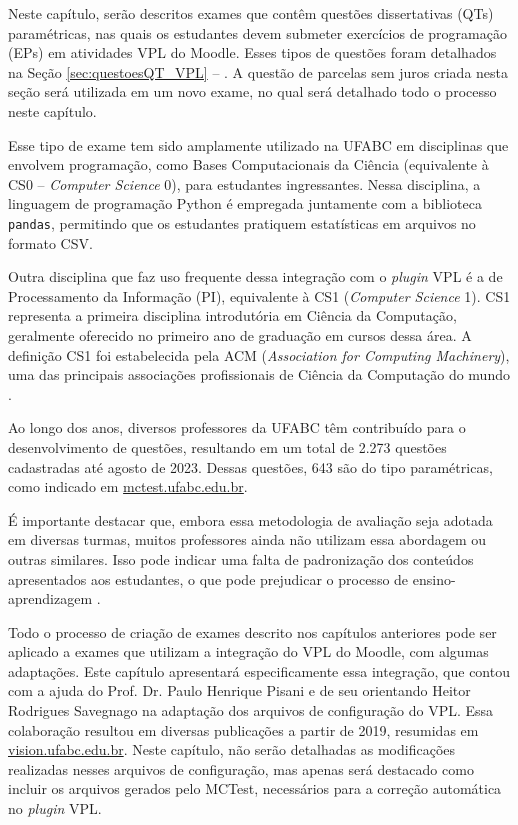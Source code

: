\label{ch:examesQT_VPL}

Neste capítulo, serão descritos exames que contêm questões dissertativas (QTs) paramétricas, nas quais os estudantes devem submeter exercícios de programação (EPs) em atividades VPL do Moodle. Esses tipos de questões foram detalhados na Seção \ref{sec:questoesQT_VPL} -- . A questão de parcelas sem juros criada nesta seção será utilizada em um novo exame, no qual será detalhado todo o processo neste capítulo.

Esse tipo de exame tem sido amplamente utilizado na UFABC em disciplinas que envolvem programação, como Bases Computacionais da Ciência (equivalente à CS0 -- \textit{Computer Science} 0), para estudantes ingressantes. Nessa disciplina, a linguagem de programação Python é empregada juntamente com a biblioteca \verb|pandas|, permitindo que os estudantes pratiquem estatísticas em arquivos no formato CSV.

Outra disciplina que faz uso frequente dessa integração com o \textit{plugin} VPL é a de Processamento da Informação (PI), equivalente à CS1 (\textit{Computer Science} 1). CS1 representa a primeira disciplina introdutória em Ciência da Computação, geralmente oferecido no primeiro ano de graduação em cursos dessa área. A definição CS1 foi estabelecida pela ACM (\textit{Association for Computing Machinery}), uma das principais associações profissionais de Ciência da Computação do mundo \cite{hogan2023cs0}.

Ao longo dos anos, diversos professores da UFABC têm contribuído para o desenvolvimento de questões, resultando em um total de 2.273 questões cadastradas até agosto de 2023. Dessas questões, 643 são do tipo paramétricas, como indicado em \href{http://mctest.ufabc.edu.br/}{mctest.ufabc.edu.br}.

É importante destacar que, embora essa metodologia de avaliação seja adotada em diversas turmas, muitos professores ainda não utilizam essa abordagem ou outras similares. Isso pode indicar uma falta de padronização dos conteúdos apresentados aos estudantes, o que pode prejudicar o processo de ensino-aprendizagem \cite{2018:Zampirolli.Goya.ea}.

Todo o processo de criação de exames descrito nos capítulos anteriores pode ser aplicado a exames que utilizam a integração do VPL do Moodle, com algumas adaptações. Este capítulo apresentará especificamente essa integração, que contou com a ajuda do Prof. Dr. Paulo Henrique Pisani e de seu orientando Heitor Rodrigues Savegnago na adaptação dos arquivos de configuração do VPL. Essa colaboração resultou em diversas publicações a partir de 2019, resumidas em \href{http://vision.ufabc.edu.br}{vision.ufabc.edu.br}. Neste capítulo, não serão detalhadas as modificações realizadas nesses arquivos de configuração, mas apenas será destacado como incluir os arquivos gerados pelo MCTest, necessários para a correção automática no \textit{plugin} VPL.




